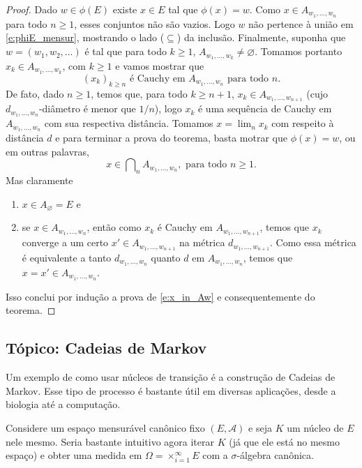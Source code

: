 \documentclass[reqno, draft]{book}
\newcommand*\1{\mathds{1}}
\DeclareMathOperator*{\mcap}{{\textstyle \bigcap}}
\begin{document}
\begin{proof}
  Dado $w \in \phi(E)$ existe $x \in E$ tal que $\phi(x) = w$.
  Como $x \in A_{w_1, \dots, w_n}$ para todo $n \geq 1$, esses conjuntos não são vazios.
  Logo $w$ não pertence à união em \eqref{e:phiE_mensur}, mostrando o lado ($\subseteq$) da inclusão.
  Finalmente, suponha que $w = (w_1, w_2, \dots)$ é tal que para todo $k \geq 1$, $A_{w_1, \dots, w_k} \neq \varnothing$.
  Tomamos portanto $x_k \in A_{w_1, \dots, w_k}$, com $k \geq 1$ e vamos mostrar que
  \begin{equation}
    \text{$(x_k)_{k \geq n}$ é Cauchy em $A_{w_1, \dots, w_n}$ para todo $n$.}
  \end{equation}
  De fato, dado $n \geq 1$, temos que, para todo $k \geq n + 1$, $x_k \in A_{w_1, \dots, w_{n+1}}$ (cujo $d_{w_1, \dots, w_{n}}$-diâmetro é menor que $1/n$), logo $x_k$ é uma sequência de Cauchy em $A_{w_1, \dots, w_n}$ com sua respectiva distância.
  Tomamos $x = \lim_n x_k$ com respeito à distância $d$ e para terminar a prova do teorema, basta motrar que $\phi(x) = w$, ou em outras palavras,
  \begin{equation}
    \label{e:x_in_Aw}
    x \in \mcap_n A_{w_1, \dots, w_n}, \text{ para todo $n \geq 1$.}
  \end{equation}
  Mas claramente
  \begin{enumerate}[\quad a)]
  \item $x \in A_\varnothing = E$ e
  \item se $x \in A_{w_1, \dots, w_n}$, então como $x_k$ é Cauchy em $A_{w_1, \dots, w_{n+1}}$, temos que $x_k$ converge a um certo $x' \in A_{w_1, \dots, w_{n+1}}$ na métrica $d_{w_1, \dots, w_{n+1}}$.
    Como essa métrica é equivalente a tanto $d_{w_1, \dots, w_n}$ quanto $d$ em $A_{w_1, \dots, w_n}$, temos que $x = x' \in A_{w_1, \dots, w_n}$.
  \end{enumerate}
  Isso conclui por indução a prova de \eqref{e:x_in_Aw} e consequentemente do teorema.
\end{proof}

\subsection{Tópico: Cadeias de Markov}

Um exemplo de como usar núcleos de transição é a construção de Cadeias de Markov.
Esse tipo de processo é bastante útil em diversas aplicações, desde a biologia até a computação.

Considere um espaço mensurável canônico fixo $(E, \mathcal{A})$ e seja $K$ um núcleo de $E$ nele mesmo.
Seria bastante intuitivo agora iterar $K$ (já que ele está no mesmo espaço) e obter uma medida em $\Omega = \times_{i=1}^\infty E$ com a $\sigma$-álgebra canônica.
\end{document}
